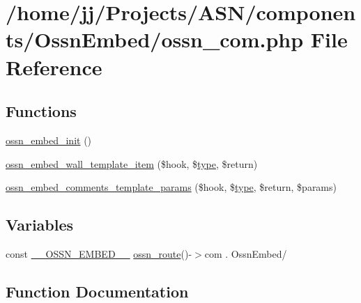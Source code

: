 \hypertarget{_ossn_embed_2ossn__com_8php}{}\section{/home/jj/\+Projects/\+A\+S\+N/components/\+Ossn\+Embed/ossn\+\_\+com.php File Reference}
\label{_ossn_embed_2ossn__com_8php}
\subsection*{Functions}
\begin{DoxyCompactItemize}
\item 
\hyperlink{_ossn_embed_2ossn__com_8php_a29123dcb7931c7e2f97547d2489bcf97}{ossn\+\_\+embed\+\_\+init} ()
\item 
\hyperlink{_ossn_embed_2ossn__com_8php_a06cfdeeacbf47cc4d9b5a93bd63fdd9a}{ossn\+\_\+embed\+\_\+wall\+\_\+template\+\_\+item} (\$hook, \$\hyperlink{_ossn_wall_2actions_2wall_2post_2group_8php_a2dc1bb4e1ed0029daa81ac0776b14b51}{type}, \$return)
\item 
\hyperlink{_ossn_embed_2ossn__com_8php_a59a0dce65f3e2b30012e09d58d59c2c5}{ossn\+\_\+embed\+\_\+comments\+\_\+template\+\_\+params} (\$hook, \$\hyperlink{_ossn_wall_2actions_2wall_2post_2group_8php_a2dc1bb4e1ed0029daa81ac0776b14b51}{type}, \$return, \$params)
\end{DoxyCompactItemize}
\subsection*{Variables}
\begin{DoxyCompactItemize}
\item 
const \hyperlink{_ossn_embed_2ossn__com_8php_a664c516ed39b8c5ff0bad3076a0a3662}{\+\_\+\+\_\+\+O\+S\+S\+N\+\_\+\+E\+M\+B\+E\+D\+\_\+\+\_\+} \hyperlink{ossn_8lib_8route_8php_ac23dc424aa33dcd57982b72f4ed1217e}{ossn\+\_\+route}()-\/$>$com . \textquotesingle{}Ossn\+Embed/\textquotesingle{}
\end{DoxyCompactItemize}


\subsection{Function Documentation}
